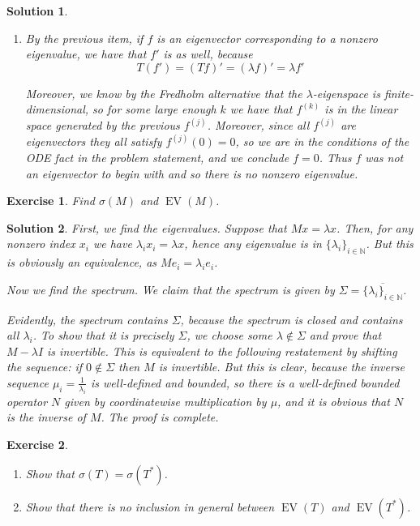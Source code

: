 \documentclass{article}
\newtheorem{ex}{Exercise}
\theoremstyle{nonumberplain}
\newtheorem{sol}{Solution}
\newcommand{\N}{\mathbb{N}}
\newcommand{\closed}[1]{\overline{#1}}
\DeclareMathOperator{\EV}{\mathrm{EV}}
\begin{document}
\begin{sol}
\begin{enumerate}
\item By the previous item, if $f$ is an eigenvector corresponding to a nonzero eigenvalue, we have that $f'$ is as well, because
\begin{equation}
T(f') = (Tf)' = (\lambda f)' = \lambda f'
\end{equation}

Moreover, we know by the Fredholm alternative that the $\lambda$-eigenspace is finite-dimensional, so for some large enough $k$ we have that $f^{(k)}$ is in the linear space generated by the previous $f^{(j)}$. Moreover, since all $f^{(j)}$ are eigenvectors they all satisfy $f^{(j)}(0) = 0$, so we are in the conditions of the ODE fact in the problem statement, and we conclude $f = 0$. Thus $f$ was not an eigenvector to begin with and so there is no nonzero eigenvalue.
\end{enumerate}
\end{sol}

\begin{ex}
Find $\sigma(M)$ and $\EV(M)$.
\end{ex}

\begin{sol}
First, we find the eigenvalues. Suppose that $Mx = \lambda x$. Then, for any nonzero index $x_i$ we have $\lambda_i x_i = \lambda x$, hence any eigenvalue is in $\{\lambda_i\}_{i \in \N}$. But this is obviously an equivalence, as $M e_i = \lambda_i e_i$.

Now we find the spectrum. We claim that the spectrum is given by $\Sigma = \closed{\{\lambda_i\}_{i\in\N}}$.

Evidently, the spectrum contains $\Sigma$, because the spectrum is closed and contains all $\lambda_i$. To show that it is precisely $\Sigma$, we choose some $\lambda \not \in \Sigma$ and prove that $M-\lambda I$ is invertible. This is equivalent to the following restatement by shifting the sequence: if $0 \not \in \Sigma$ then $M$ is invertible. But this is clear, because the inverse sequence $\mu_i = \frac1{\lambda_i}$ is well-defined and bounded, so there is a well-defined bounded operator $N$ given by coordinatewise multiplication by $\mu$, and it is obvious that $N$ is the inverse of $M$. The proof is complete.
\end{sol}

\begin{ex}
\leavevmode
\begin{enumerate}
\item Show that $\sigma(T) = \sigma(T^*)$.
\item Show that there is no inclusion in general between $\EV(T)$ and $\EV(T^*)$.
\end{enumerate}
\end{ex}
\end{document}
